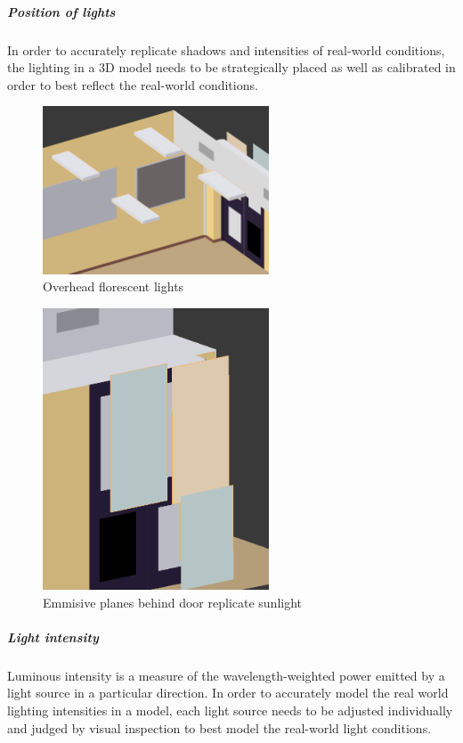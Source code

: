 \documentclass[11pt,a4paper]{report}
\begin{document}
					\subparagraph{Position of lights}
						In order to accurately replicate shadows and intensities of real-world conditions, the lighting in a 3D model needs to be strategically placed as well as calibrated in order to best reflect the real-world conditions.
						
						\begin{figure}[H]
							\centering
							\includegraphics[width=0.6\textwidth]{overhead_lights}
							\caption{Overhead florescent lights}
						\end{figure}
						\begin{figure}[H]
							\centering
							\includegraphics[width=0.6\textwidth]{lights_behind_door}
							\caption{Emmisive planes behind door replicate sunlight}
						\end{figure}
					
					\subparagraph{Light intensity}
						Luminous intensity is a measure of the wavelength-weighted power emitted by a light source in a particular direction. In order to accurately model the real world lighting intensities in a model, each light source needs to be adjusted individually and judged by visual inspection to best model the real-world light conditions.
						
\end{document}
